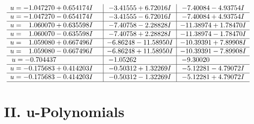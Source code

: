 \documentclass[1p]{elsarticle_modified}
\theoremstyle{definition}
\begin{document}
$$\begin{array}{c|c|c}
\begin{aligned}
u &= -1.047270 + 0.654174 I\end{aligned}
 & -3.41555 + 6.72016 I & -7.40084 - 4.93754 I \\ \hline\begin{aligned}
u &= -1.047270 - 0.654174 I\end{aligned}
 & -3.41555 - 6.72016 I & -7.40084 + 4.93754 I \\ \hline\begin{aligned}
u &= \phantom{-}1.060070 + 0.635598 I\end{aligned}
 & -7.40758 - 2.28828 I & -11.38974 + 1.78470 I \\ \hline\begin{aligned}
u &= \phantom{-}1.060070 - 0.635598 I\end{aligned}
 & -7.40758 + 2.28828 I & -11.38974 - 1.78470 I \\ \hline\begin{aligned}
u &= \phantom{-}1.059080 + 0.667496 I\end{aligned}
 & -6.86248 - 11.58950 I & -10.39391 + 7.89908 I \\ \hline\begin{aligned}
u &= \phantom{-}1.059080 - 0.667496 I\end{aligned}
 & -6.86248 + 11.58950 I & -10.39391 - 7.89908 I \\ \hline\begin{aligned}
u &= -0.704437\phantom{ +0.000000I}\end{aligned}
 & -1.05262\phantom{ +0.000000I} & -9.30020\phantom{ +0.000000I} \\ \hline\begin{aligned}
u &= -0.175683 + 0.414203 I\end{aligned}
 & -0.50312 + 1.32269 I & -5.12281 - 4.79072 I \\ \hline\begin{aligned}
u &= -0.175683 - 0.414203 I\end{aligned}
 & -0.50312 - 1.32269 I & -5.12281 + 4.79072 I\\
 \hline 
 \end{array}$$\newpage
\newpage\renewcommand{\arraystretch}{1}
\centering \section*{ II. u-Polynomials}
\end{document}
